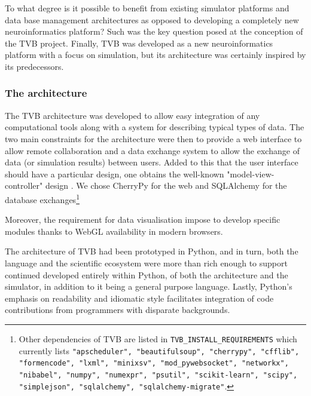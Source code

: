 To what degree is it possible to benefit from existing simulator platforms and
data base management architectures as opposed to developing a completely new
neuroinformatics platform? Such was the key question posed at the conception of
the TVB project. Finally, TVB was developed as a new neuroinformatics platform
with a focus on simulation, but its architecture was certainly inspired by its
predecessors.

\subsubsection{The architecture}


The TVB architecture was developed to allow easy integration of any
computational tools along with a system for describing typical types of data.
The two main constraints for the architecture were then to provide a web
interface to allow remote collaboration and a data exchange system to allow the
exchange of data (or simulation results) between users. Added to this that
the user interface should have a particular design, one obtains the well-known
"model-view-controller" design .  We chose
\textsf{CherryPy} for the web  and \textsf{SQLAlchemy} for the database
exchanges\footnote{Other dependencies of TVB are listed in
    \texttt{TVB\_INSTALL\_REQUIREMENTS} which currently lists
    \texttt{"apscheduler", "beautifulsoup", "cherrypy", "cfflib", "formencode",
        "lxml", "minixsv", "mod\_pywebsocket", "networkx", "nibabel", "numpy",
        "numexpr", "psutil", "scikit-learn", "scipy", "simplejson",
        "sqlalchemy", "sqlalchemy-migrate"}.}

Moreover, the requirement for data visualisation impose to develop specific
modules thanks to WebGL availability in modern browsers.

The architecture of TVB had been prototyped in Python, and in turn, both the
language and the scientific ecosystem were more than rich enough to support
continued developed entirely within Python, of both the architecture and the
simulator, in addition to it being a general purpose language. Lastly, Python's
emphasis on readability and idiomatic style facilitates integration of 
code contributions from programmers with disparate backgrounds.


